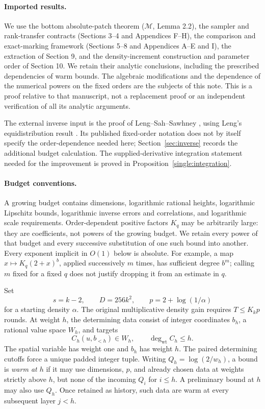 \documentclass[11pt,a4paper]{article}
\theoremstyle{definition}
\newcommand{\M}{\mathcal M}
\newcommand{\wt}{\operatorname{wt}}
\begin{document}
\paragraph{Imported results.}
We use the bottom absolute-patch theorem (\(\M\), Lemma 2.2), the
sampler and rank-transfer contracts (Sections 3--4 and Appendices F--H),
the comparison and exact-marking framework (Sections 5--8 and Appendices
A--E and I), the extraction of Section 9, and the density-increment
construction and parameter order of Section 10. We retain their
analytic conclusions, including the prescribed dependencies of warm
bounds. The algebraic modifications and the dependence of the numerical
powers on the fixed orders are the subjects of this note. This is a
proof relative to that manuscript, not a replacement proof or an
independent verification of all its analytic arguments.

The external inverse input is the proof of Leng--Sah--Sawhney
\cite{lss}, using Leng's equidistribution result \cite{leng}. Its
published fixed-order notation does not by itself specify the
order-dependence needed here; Section~\ref{sec:inverse} records the
additional budget calculation. The supplied-derivative integration statement needed for the
improvement is proved in Proposition~\ref{single:integration}.

\paragraph{Budget conventions.}
A growing budget contains dimensions, logarithmic rational heights,
logarithmic Lipschitz bounds, logarithmic inverse errors and correlations,
and logarithmic scale requirements. Order-dependent positive factors
\(K_q\) may be arbitrarily large: they are coefficients, not powers of
the growing budget. We retain every power of that budget and every
successive substitution of one such bound into another. Every exponent
implicit in \(O(1)\) below is absolute. For example, a map
\(x\mapsto K_q(2+x)^b\), applied successively \(m\) times, has
sufficient degree \(b^m\); calling \(m\) fixed for a fixed \(q\)
does not justify dropping it from an estimate in \(q\).

Set
\[
 s=k-2,\qquad D=256k^2,\qquad p=2+\log(1/\alpha)
\]
for a starting density \(\alpha\). The original multiplicative density
gain requires \(T\le K_kp\) rounds. At weight \(h\), the determining
data consist of integer coordinates \(b_h\), a rational value space
\(W_h\), and targets
\[
 C_h(u,b_{<h})\in W_h,\qquad \deg_{\wt} C_h\le h.
\]
The spatial variable has weight one and \(b_h\) has weight \(h\).
The paired determining cutoffs force a unique padded integer tuple.
Writing \(Q_h=\log(2/w_h)\), a bound is \emph{warm at \(h\)} if it
may use dimensions, \(p\), and already chosen data at weights strictly
above \(h\), but none of the incoming \(Q_i\) for \(i\le h\).
A preliminary bound at \(h\) may also use \(Q_h\). Once retained as
history, such data are warm at every subsequent layer \(j<h\).
\end{document}
